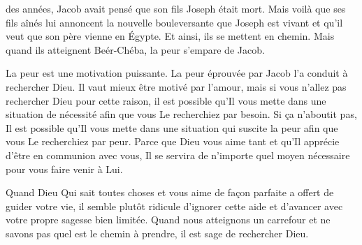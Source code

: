\dvrule






 des années,
 Jacob avait pensé que son fils Joseph était mort.
 Mais voilà que ses fils aînés lui annoncent la nouvelle bouleversante
 que Joseph est vivant et qu'il veut que son père vienne en Égypte.
 Et ainsi, ils se mettent en chemin.
 Mais quand ils atteignent Beér-Chéba, la peur s'empare de Jacob. 

La peur est une motivation puissante.
 La peur éprouvée par Jacob l'a conduit à rechercher Dieu.
 Il vaut mieux être motivé par l'amour,
 mais si vous n'allez pas rechercher Dieu pour cette raison,
 il est possible qu'Il vous mette dans une situation de nécessité
 afin que vous Le recherchiez par besoin.
 Si ça n'aboutit pas, Il est possible qu'Il vous mette
 dans une situation qui suscite la peur afin que vous Le recherchiez par peur.
 Parce que Dieu vous aime tant et qu'Il apprécie d'être en communion avec vous,
 Il se servira de n'importe quel moyen nécessaire pour vous faire venir à Lui.


Quand Dieu \ocadr{}Qui sait toutes choses et vous aime de façon parfaite\fcadr{}
 a offert de guider votre vie, il semble plutôt ridicule d'ignorer
 cette aide et d'avancer avec votre propre sagesse bien limitée.
 Quand nous atteignons un carrefour et ne savons pas
 quel est le chemin à prendre, il est sage de rechercher Dieu. 

\dvrule




